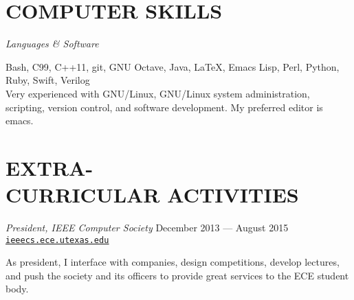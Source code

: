 \documentclass[margin]{res}
\begin{document}
\begin{resume}
  \section{COMPUTER SKILLS}
  {\sl Languages \& Software} \\
  \vspace{-1.0em}
  \begin{adjustwidth}{1.5em}{0pt}
    Bash, C99, C++11, git, GNU Octave, Java, \LaTeX, Emacs Lisp, Perl, Python,
    Ruby, Swift, Verilog
    \vspace{0.5em} \\
    Very experienced with GNU/Linux, GNU/Linux system administration, scripting,
    version control, and software development. My preferred editor is emacs.
  \end{adjustwidth}

  \section{EXTRA-\\CURRICULAR ACTIVITIES}
  {\sl President, IEEE Computer Society}
  \hfill December 2013 --- August 2015 \\
  \href{http://ieeecs.ece.utexas.edu}{\ul{\texttt{ieeecs.ece.utexas.edu}}}
  \begin{adjustwidth}{1.5em}{0pt}
    As president, I interface with companies, design competitions, develop
    lectures, and push the society and its officers to provide great services to
    the ECE student body.
   \end{adjustwidth}
\end{resume}
\end{document}
